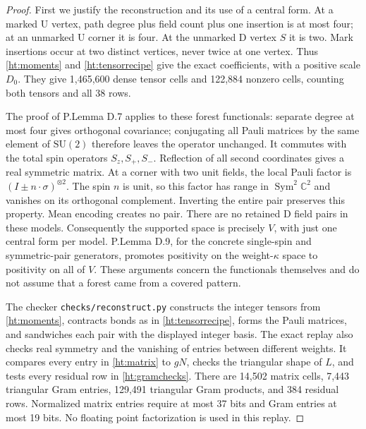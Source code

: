 \begin{proof}
First we justify the reconstruction and its use of a central form.
At a marked U vertex, path degree plus field count plus one insertion
is at most four; at an unmarked U corner it is four. At the unmarked
D vertex \(S\) it is two. Mark insertions occur at two distinct vertices,
never twice at one vertex. Thus \eqref{ht:moments} and
\eqref{ht:tensorrecipe} give the exact coefficients, with a positive
scale \(D_0\). They give 1,465,600 dense tensor cells and 122,884
nonzero cells, counting both tensors and all 38 rows.

The proof of P.Lemma D.7 applies to these forest functionals: separate
degree at most four gives orthogonal covariance; conjugating all Pauli
matrices by the same element of \(\mathrm{SU}(2)\) therefore leaves
the operator unchanged. It commutes with the total spin operators
\(S_z,S_+,S_-\). Reflection of all second coordinates gives a real
symmetric matrix. At a corner with two unit fields, the local Pauli
factor is \((I\pm n\cdot\sigma)^{\otimes2}\). The spin \(n\) is
unit, so this factor has range in \(\operatorname{Sym}^2\mathbb C^2\)
and vanishes on its orthogonal complement. Inverting the entire pair
preserves this property. Mean encoding creates no pair. There are no
retained D field pairs in these models. Consequently the supported
space is precisely \(V\), with just one central form per model.
P.Lemma D.9, for the concrete single-spin and symmetric-pair generators,
promotes positivity on the weight-\(\kappa\) space to positivity on all
of \(V\). These arguments concern the functionals themselves and do
not assume that a forest came from a covered pattern.

The checker \texttt{checks/reconstruct.py} constructs the integer tensors
from \eqref{ht:moments}, contracts bonds as in \eqref{ht:tensorrecipe},
forms the Pauli matrices, and sandwiches each pair with the displayed
integer basis. The exact replay also checks real symmetry and the
vanishing of entries between different weights. It compares every
entry in \eqref{ht:matrix} to \(gN\), checks the triangular shape of
\(L\), and tests every residual row in \eqref{ht:gramchecks}.
There are 14,502 matrix cells, 7,443 triangular Gram entries,
129,491 triangular Gram products, and 384 residual rows. Normalized
matrix entries require at most 37 bits and Gram entries at most 19 bits.
No floating point factorization is used in this replay.


\end{proof}
